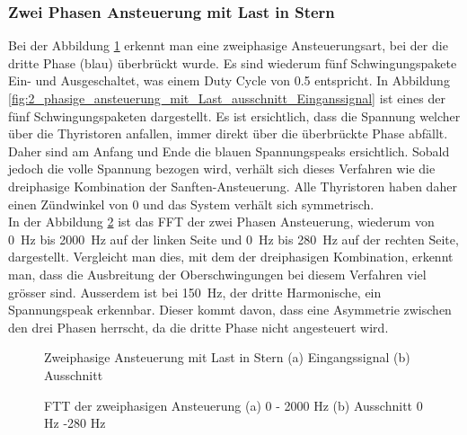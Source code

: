 \subsubsection*{Zwei Phasen Ansteuerung mit Last in Stern}\label{sec:2_phasen_Ansteuerung}
Bei der Abbildung \ref{fig:2_phasige_ansteuerung_mit_Last} erkennt man eine zweiphasige Ansteuerungsart, bei der die dritte Phase (blau) überbrückt wurde. Es sind wiederum fünf Schwingungspakete Ein- und Ausgeschaltet, was einem Duty Cycle von 0.5 entspricht. In Abbildung \ref{fig:2_phasige_ansteuerung_mit_Last_ausschnitt_Einganssignal} ist eines der fünf Schwingungspaketen dargestellt. Es ist ersichtlich, dass die Spannung welcher über die Thyristoren anfallen, immer direkt über die überbrückte Phase abfällt. Daher sind am Anfang und Ende die blauen Spannungspeaks ersichtlich. Sobald jedoch die volle Spannung bezogen wird, verhält sich dieses Verfahren wie die dreiphasige Kombination der Sanften-Ansteuerung. Alle Thyristoren haben daher einen Zündwinkel von 0\textdegree\hspace{0.02cm} und das System verhält sich symmetrisch.\\
In der Abbildung \ref{fig:2_phasige_ansteuerung_mit_Last_FFT} ist das FFT der zwei Phasen Ansteuerung, wiederum von \SI{0}{Hz} bis \SI{2000}{Hz} auf der linken Seite und \SI{0}{Hz} bis \SI{280}{Hz} auf der rechten Seite, dargestellt. Vergleicht man dies, mit dem der dreiphasigen Kombination, erkennt man, dass die Ausbreitung der Oberschwingungen bei diesem Verfahren viel grösser sind. Ausserdem ist bei \SI{150}{Hz}, der dritte Harmonische, ein Spannungspeak erkennbar. Dieser kommt davon, dass eine Asymmetrie zwischen den drei Phasen herrscht, da die dritte Phase nicht angesteuert wird.

\begin{figure}[ht!]
	\centering
	\qquad
	\caption{Zweiphasige Ansteuerung mit Last in Stern (a) Eingangssignal (b) Ausschnitt}
	\label{fig:2_phasige_ansteuerung_mit_Last}
\end{figure}


\begin{figure}[ht!]
	\centering
	\qquad
	\caption{FTT der zweiphasigen Ansteuerung  (a) 0 - 2000 Hz (b) Ausschnitt 0 Hz -280 Hz}
	\label{fig:2_phasige_ansteuerung_mit_Last_FFT}
\end{figure}



